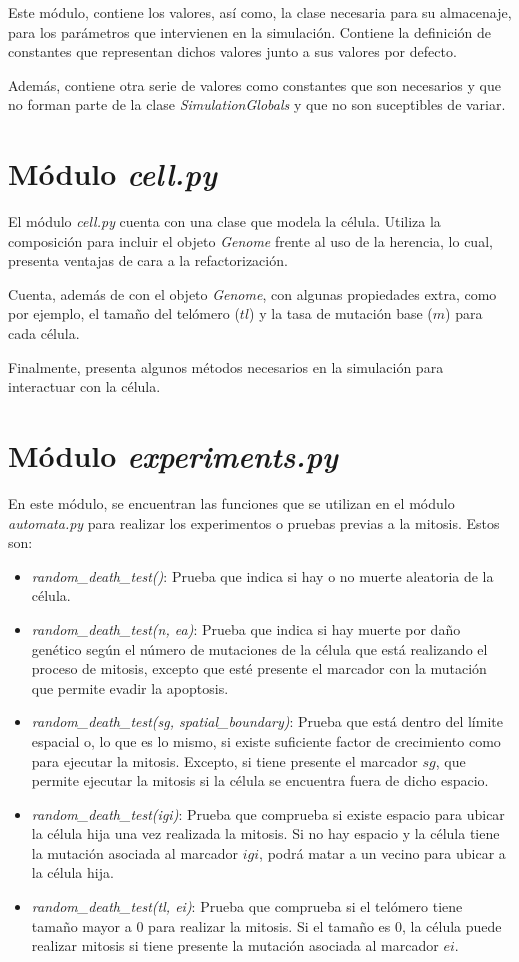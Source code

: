 Este módulo, contiene los valores, así como, la clase necesaria para su almacenaje, para
los parámetros que intervienen en la simulación. Contiene la definición de constantes que
representan dichos valores junto a sus valores por defecto.

Además, contiene otra serie de valores como constantes que son necesarios y que no forman parte de la
clase \textit{SimulationGlobals} y que no son suceptibles de variar.

\section{Módulo \textit{cell.py}}

El módulo \textit{cell.py} cuenta con una clase que modela la célula. Utiliza la composición
para incluir el objeto \textit{Genome} frente al uso de la herencia, lo cual, presenta ventajas
de cara a la refactorización.

Cuenta, además de con el objeto \textit{Genome}, con algunas propiedades extra, como por ejemplo,
el tamaño del telómero ($tl$) y la tasa de mutación base ($m$) para cada célula.

Finalmente, presenta algunos métodos necesarios en la simulación para interactuar con la célula.

\section{Módulo \textit{experiments.py}}

En este módulo, se encuentran las funciones que se utilizan en el módulo
\textit{automata.py} para realizar los experimentos o pruebas previas a la mitosis. Estos son:

\begin{itemize}
  \item \textit{random\_death\_test()}: Prueba que indica si hay o no muerte aleatoria de la célula.
  \item \textit{random\_death\_test(n, ea)}: Prueba que indica si hay muerte por daño genético según
  el número de mutaciones de la célula que está realizando el proceso de mitosis, excepto que esté
  presente el marcador con la mutación que permite evadir la apoptosis.
  \item \textit{random\_death\_test(sg, spatial\_boundary)}: Prueba que está dentro del
  límite espacial o, lo que es lo mismo, si existe suficiente factor de crecimiento como
  para ejecutar la mitosis. Excepto, si tiene presente el marcador $sg$, que permite
  ejecutar la mitosis si la célula se encuentra fuera de dicho espacio.
  \item \textit{random\_death\_test(igi)}: Prueba que comprueba si existe espacio para ubicar la célula
  hija una vez realizada la mitosis. Si no hay espacio y la célula tiene la mutación asociada al
  marcador $igi$, podrá matar a un vecino para ubicar a la célula hija.
  \item \textit{random\_death\_test(tl, ei)}: Prueba que comprueba si el telómero tiene tamaño
  mayor a $0$ para realizar la mitosis. Si el tamaño es $0$, la célula puede realizar mitosis
  si tiene presente la mutación asociada al marcador $ei$.
\end{itemize}

